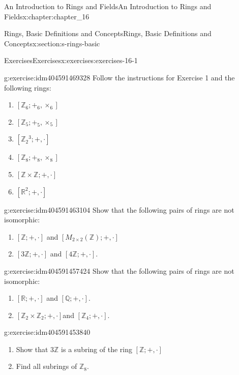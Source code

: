 \documentclass[twoside,10pt,]{book}
\numberwithin{equation}{section}
\begin{document}
\begin{chapterptx}{An Introduction to Rings and Fields}{}{An Introduction to Rings and Fields}{}{}{x:chapter:chapter_16}
\begin{sectionptx}{Rings, Basic Definitions and Concepts}{}{Rings, Basic Definitions and Concepts}{}{}{x:section:s-rings-basic}
\begin{exercises-subsection}{Exercises}{}{Exercises}{}{}{x:exercises:exercises-16-1}
\begin{divisionexercise}{2}{}{}{g:exercise:idm404591469328}%
Follow the instructions for Exercise 1 and the following rings:%
\begin{multicols}{2}
\begin{enumerate}[label=(\alph*)]
\item{}\(\left[\mathbb{Z}_6;+_6,\times_6\right]\)%
\item{}\(\left[\mathbb{Z}_5;+_5,\times_5\right]\)%
\item{}\(\left[\mathbb{Z}_2{}^3;+,\cdot \right]\)%
\item{}\(\left[\mathbb{Z}_8; +_8 , \times_8 \right]\)%
\item{}\([\mathbb{Z} \times \mathbb{Z}; +, \cdot ]\)%
\item{}\(\left[\mathbb{R}^2; +, \cdot \right]\)%
\end{enumerate}
\end{multicols}
%
\end{divisionexercise}%
\begin{divisionexercise}{3}{}{}{g:exercise:idm404591463104}%
Show that the following pairs of rings are not isomorphic:%
\begin{enumerate}[label=(\alph*)]
\item{}\([\mathbb{Z};+,\cdot ]\) and \(\left[M_{2\times 2}(\mathbb{Z});+,\cdot \right]\)%
\item{}\([3\mathbb{Z};+, \cdot ]\) and \([4\mathbb{Z};+, \cdot ]\).%
\end{enumerate}
%
\end{divisionexercise}%
\begin{divisionexercise}{4}{}{}{g:exercise:idm404591457424}%
Show that the following pairs of rings are not isomorphic:%
\begin{enumerate}[label=(\alph*)]
\item{}\([\mathbb{R}; +, \cdot ]\) and \([\mathbb{Q};+, \cdot ]\).%
\item{}\(\left[\mathbb{Z}_2 \times  \mathbb{Z}_2; +,\cdot \right]\)and \(\left[\mathbb{Z}_4; +, \cdot \right]\).%
\end{enumerate}
%
\end{divisionexercise}%
\begin{divisionexercise}{5}{}{}{g:exercise:idm404591453840}%
%
\begin{enumerate}[label=(\alph*)]
\item{}Show that \(3\mathbb{Z}\) is a subring of the ring \([\mathbb{Z}; +, \cdot]\)%
\item{}Find all subrings of \(\mathbb{Z}_8\).%

\end{enumerate}
\end{divisionexercise}
\end{exercises-subsection}
\end{sectionptx}
\end{chapterptx}
\end{document}
